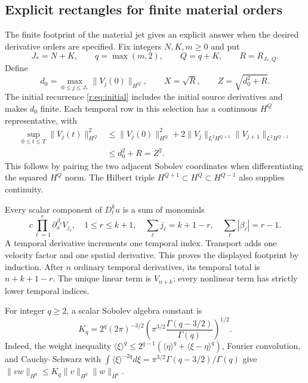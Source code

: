 \subsection{Explicit rectangles for finite material orders}
\label{r:sec:material-target-rectangle}

The finite footprint of the material jet gives an explicit answer when
the desired derivative orders are specified. Fix integers \(N,K,m\ge0\)
and put
\[
 J_*=N+K,\qquad q=\max(m,2),\qquad Q=q+K,
 \qquad R=R_{J_*,Q}.
\]
Define
\[
 d_0=\max_{0\le j\le J_*}\|V_j(0)\|_{H^Q},\qquad
 X=\sqrt R,\qquad Z=\sqrt{d_0^2+R}.
\]
The initial recurrence \eqref{r:eq:initial} includes the initial source
derivatives and makes \(d_0\) finite. Each temporal row in this selection
has a continuous \(H^Q\) representative, with
\begin{equation}
\begin{aligned}
 \sup_{0\le t\le T}\|V_j(t)\|_{H^Q}^2
 &\le\|V_j(0)\|_{H^Q}^2
 +2\|V_j\|_{L^2H^{Q+1}}\|V_{j+1}\|_{L^2H^{Q-1}}\\
 &\le d_0^2+R=Z^2.
\end{aligned}
\label{r:eq:material-target-trace}
\end{equation}
This follows by pairing the two adjacent Sobolev coordinates when
differentiating the squared \(H^Q\) norm. The Hilbert triple
\(H^{Q+1}\subset H^Q\subset H^{Q-1}\) also supplies continuity.

Every scalar component of \(D_t^ku\) is a sum of monomials
\[
 c\prod_{\ell=1}^{r}\partial_x^{\beta_\ell}V_{j_\ell},
 \quad 1\le r\le k+1,\quad
 \sum_\ell j_\ell=k+1-r,\quad
 \sum_\ell|\beta_\ell|=r-1.
\]
A temporal derivative increments one temporal index. Transport adds
one velocity factor and one spatial derivative. This proves the
displayed footprint by induction. After \(n\) ordinary temporal
derivatives, its temporal total is \(n+k+1-r\). The unique linear term
is \(V_{n+k}\); every nonlinear term has strictly lower temporal indices.

For integer \(q\ge2\), a scalar Sobolev algebra constant is
\[
 K_q=2^q(2\pi)^{-3/2}
 \left(\pi^{3/2}\frac{\Gamma(q-3/2)}{\Gamma(q)}\right)^{1/2}.
\]
Indeed, the weight inequality
\(\langle\xi\rangle^q\le2^{q-1}
(\langle\eta\rangle^q+\langle\xi-\eta\rangle^q)\), Fourier
convolution, and Cauchy--Schwarz with
\(\int\langle\xi\rangle^{-2q}d\xi
=\pi^{3/2}\Gamma(q-3/2)/\Gamma(q)\) give
\(\|vw\|_{H^q}\le K_q\|v\|_{H^q}\|w\|_{H^q}\).

